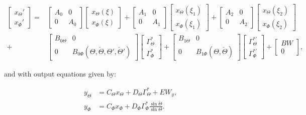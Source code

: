 \documentclass[../main.tex]{subfiles}
\begin{document}
\begin{align}
	\begin{bmatrix}
	x_\Theta' \\
	x_\Phi'
	\end{bmatrix} =&
	\begin{bmatrix}
	A_0 & 0 \\
	0 & A_0
	\end{bmatrix}
	\begin{bmatrix}
	x_\Theta(\xi) \\
	x_\Phi(\xi)
	\end{bmatrix} + 
	\begin{bmatrix}
	A_1 & 0 \\
	0 & A_1
	\end{bmatrix}
	\begin{bmatrix}
	x_\Theta(\xi_1) \\
	x_\Phi(\xi_1)
	\end{bmatrix} +
	\begin{bmatrix}
	A_2 & 0 \\
	0 & A_2
	\end{bmatrix}
	\begin{bmatrix}
	x_\Theta(\xi_2) \\
	x_\Phi(\xi_2)
	\end{bmatrix} \nonumber\\
	+&
	\begin{bmatrix}
	B_{0\Theta} & 0\\
	0 & B_{0\Phi}(\Theta,\check{\Theta},\Theta',\check{\Theta}')
	\end{bmatrix} 
	\begin{bmatrix}
	\Gamma_\Theta^* \\
	\Gamma_\Phi^*
	\end{bmatrix} +
	\begin{bmatrix}
	B_{1\Theta} & 0\\
	0 & B_{1\Phi}(\Theta,\check{\Theta})
	\end{bmatrix} 
	\begin{bmatrix}
	\Gamma_\Theta^{*'} \\
	\Gamma_\Phi^{*'}
	\end{bmatrix} + 
	\begin{bmatrix}
	BW \\
	0
	\end{bmatrix},
	\label{eq:systemstatespacerobust}	
\end{align}

and with output equations given by:

	\begin{align}
		y_\Theta &= C_\Theta x_\Theta + D_\Theta \Gamma_\Theta^* + E W_y, \label{eq:output12robust}\\
		y_\Phi &= C_\Phi x_\Phi + D_\Phi \Gamma_\Phi^*	\frac{\sin \check{\Theta}}{\sin \Theta}	.\label{eq:output22robust}	
	\end{align}
\end{document}
